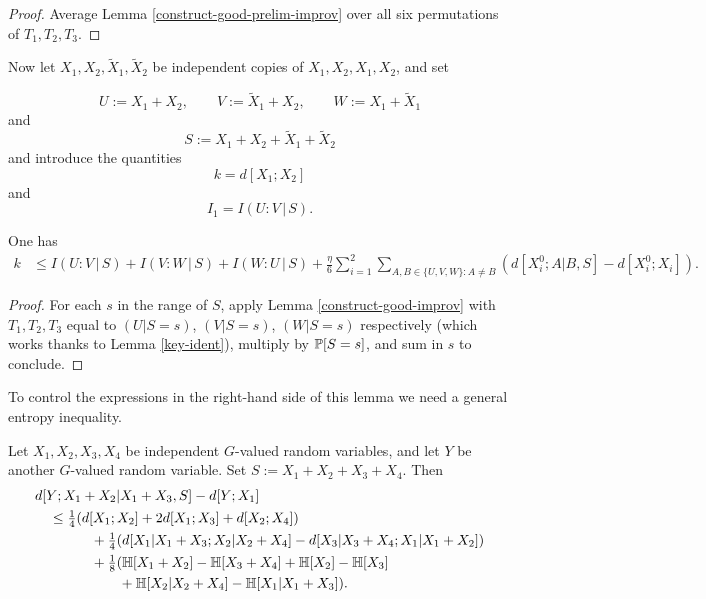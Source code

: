 \begin{proof}
\leanok
Average Lemma \ref{construct-good-prelim-improv} over all six permutations of $T_1,T_2,T_3$.
\end{proof}

Now let $X_1, X_2, \tilde X_1, \tilde X_2$ be independent copies of $X_1, X_2, X_1, X_2$, and set

\[U := X_1 + X_2, \qquad V := \tilde X_1 + X_2, \qquad W := X_1 + \tilde X_1\] and
\[  S := X_1 + X_2 + \tilde X_1 + \tilde X_2\]
and introduce the quantities
$$ k = d[X_1;X_2]$$
and
$$ I_1 = I(U : V \, | \, S).$$

\begin{lemma}\label{averaged-construct-good}\leanok
  One has
  \begin{align*}  k & \leq I(U : V \, | \, S) + I(V : W \, | \,S) + I(W : U \, | \, S) + \frac{\eta}{6}  \sum_{i=1}^2 \sum_{A,B \in \{U,V,W\}: A \neq B} (d[X^0_i;A|B,S] - d[X^0_i; X_i]).
    \end{align*}
\end{lemma}

\begin{proof}  For each $s$ in the range of $S$, apply Lemma \ref{construct-good-improv} with $T_1,T_2,T_3$ equal to $(U|S=s)$, $(V|S=s)$, $(W|S=s)$ respectively (which works thanks to Lemma \ref{key-ident}), multiply by $\mathbb{P}[S=s]$, and sum in $s$ to conclude.
\end{proof}

To control the expressions in the right-hand side of this lemma we need a general entropy inequality.

\begin{lemma}\label{gen-ineq} \leanok Let $X_1, X_2, X_3, X_4$ be independent $G$-valued random variables, and let $Y$ be another $G$-valued random variable.  Set $S := X_1+X_2+X_3+X_4$. Then
  \begin{align*}
    &  d[Y; X_1+X_2|X_1 + X_3, S] - d[Y; X_1] \\
    &\quad \leq \tfrac{1}{4} (d[X_1;X_2] + 2d[X_1;X_3] + d[X_2;X_4])\\
    &\qquad \qquad + \tfrac{1}{4} (d[X_1|X_1+X_3;X_2|X_2+X_4] - d[X_3|X_3+X_4; X_1|X_1+X_2])\\
    &\qquad \qquad + \tfrac{1}{8} (\mathbb{H}[X_1+X_2] - \mathbb{H}[X_3+X_4] + \mathbb{H}[X_2] - \mathbb{H}[X_3]\\
    &\qquad \qquad \qquad + \mathbb{H}[X_2|X_2+X_4] - \mathbb{H}[X_1|X_1+X_3]).
\end{align*}
\end{lemma}

